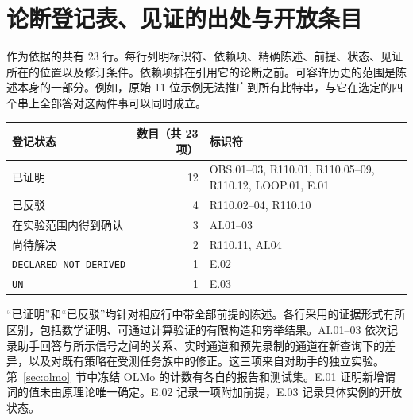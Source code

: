 \section{论断登记表、见证的出处与开放条目}
\label{app:registers}

作为依据的共有 23 行。每行列明标识符、依赖项、精确陈述、前提、状态、见证所在的位置以及修订条件。依赖项排在引用它的论断之前。可容许历史的范围是陈述本身的一部分。例如，原始 11 位示例无法推广到所有比特串，与它在选定的四个串上全部答对这两件事可以同时成立。

\begin{center}
\begin{tabularx}{\linewidth}{@{}l r X@{}}
\toprule
登记状态 & 数目（共 23 项） & 标识符 \\
\midrule
已证明 & 12 & OBS.01--03, R110.01, R110.05--09, R110.12, LOOP.01, E.01 \\
已反驳 & 4 & R110.02--04, R110.10 \\
在实验范围内得到确认 & 3 & AI.01--03 \\
尚待解决 & 2 & R110.11, AI.04 \\
\texttt{DECLARED\_NOT\_DERIVED} & 1 & E.02 \\
\texttt{UN} & 1 & E.03 \\
\bottomrule
\end{tabularx}
\end{center}

“已证明”和“已反驳”均针对相应行中带全部前提的陈述。各行采用的证据形式有所区别，包括数学证明、可通过计算验证的有限构造和穷举结果。AI.01--03 依次记录助手回答与所示信号之间的关系、实时通道和预先录制的通道在新查询下的差异，以及对既有策略在受测任务族中的修正。这三项来自对助手的独立实验。第~\ref{sec:olmo}~节中冻结 OLMo 的计数有各自的报告和测试集。E.01 证明新增谓词的值未由原理论唯一确定。E.02 记录一项附加前提，E.03 记录具体实例的开放状态。


